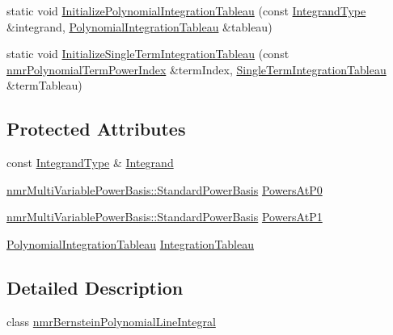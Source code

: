 \begin{DoxyCompactItemize}
\item 
static void \hyperlink{classnmr_bernstein_polynomial_line_integral_a8e151090a2dd8cb6e6ec5f9f3595bfa7}{Initialize\-Polynomial\-Integration\-Tableau} (const \hyperlink{classnmr_bernstein_polynomial_line_integral_a5c7945eacbf7d3d225de9d11bbac138c}{Integrand\-Type} \&integrand, \hyperlink{classnmr_bernstein_polynomial_line_integral_a60deb00991c5e0971d60280bcbb7a405}{Polynomial\-Integration\-Tableau} \&tableau)
\item 
static void \hyperlink{classnmr_bernstein_polynomial_line_integral_a6ff825644582e0e351f559f27fd0c36f}{Initialize\-Single\-Term\-Integration\-Tableau} (const \hyperlink{classnmr_polynomial_term_power_index}{nmr\-Polynomial\-Term\-Power\-Index} \&term\-Index, \hyperlink{classnmr_bernstein_polynomial_line_integral_a1d31908eb8195d1c00427f12dee7fe6b}{Single\-Term\-Integration\-Tableau} \&term\-Tableau)
\end{DoxyCompactItemize}
\subsection*{Protected Attributes}
\begin{DoxyCompactItemize}
\item 
const \hyperlink{classnmr_bernstein_polynomial_line_integral_a5c7945eacbf7d3d225de9d11bbac138c}{Integrand\-Type} \& \hyperlink{classnmr_bernstein_polynomial_line_integral_adbc106d66e19ba746e42de7fda86782c}{Integrand}
\item 
\hyperlink{classnmr_multi_variable_power_basis_a7aea4d2b9847560899648720ee61b988}{nmr\-Multi\-Variable\-Power\-Basis\-::\-Standard\-Power\-Basis} \hyperlink{classnmr_bernstein_polynomial_line_integral_a2afceb5c30ca047d1e04fd5133843f63}{Powers\-At\-P0}
\item 
\hyperlink{classnmr_multi_variable_power_basis_a7aea4d2b9847560899648720ee61b988}{nmr\-Multi\-Variable\-Power\-Basis\-::\-Standard\-Power\-Basis} \hyperlink{classnmr_bernstein_polynomial_line_integral_aa7a7f9670060b02df2585e72b9895162}{Powers\-At\-P1}
\item 
\hyperlink{classnmr_bernstein_polynomial_line_integral_a60deb00991c5e0971d60280bcbb7a405}{Polynomial\-Integration\-Tableau} \hyperlink{classnmr_bernstein_polynomial_line_integral_a456c109c5eae6cf3194a6e5aae8a6ec0}{Integration\-Tableau}
\end{DoxyCompactItemize}


\subsection{Detailed Description}
class \hyperlink{classnmr_bernstein_polynomial_line_integral}{nmr\-Bernstein\-Polynomial\-Line\-Integral}


